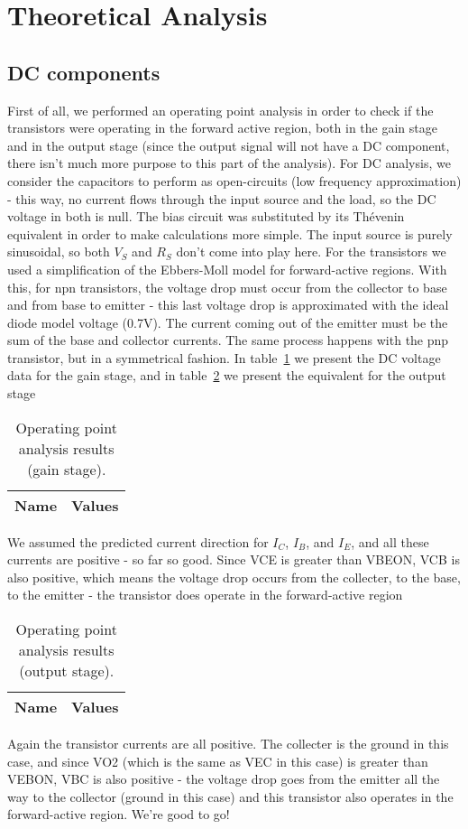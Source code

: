 \section{Theoretical Analysis}
\label{sec:analysis}
\subsection{DC components}
First of all, we performed an operating point analysis in order to check if the transistors were operating in the forward active region, both in the gain stage and in the output stage (since the output signal will not have a DC component, there isn't much more purpose to this part of the analysis). For DC analysis, we consider the capacitors to perform as open-circuits (low frequency approximation) - this way, no current flows through the input source and the load, so the DC voltage in both is null. The bias circuit was substituted by its Thévenin equivalent in order to make calculations more simple. The input source is purely sinusoidal, so both $V_{S}$ and $R_{S}$ don't come into play here. For the transistors we used a simplification of the Ebbers-Moll model for forward-active regions. With this, for npn transistors, the voltage drop must occur from the collector to base and from base to emitter - this last voltage drop is approximated with the ideal diode model voltage (0.7V). The current coming out of the emitter must be the sum of the base and collector currents. The same process happens with the pnp transistor, but in a symmetrical fashion. 
In table~\ref{tab:data} we present the DC voltage data for the gain stage, and in table~\ref{tab:data2} we present the equivalent for the output stage
\begin{table}[h!]
  \centering
  \begin{tabular}{|l|r|}
    \hline    
    {\bf Name} & {\bf Values} \\ \hline
     
  \end{tabular}
  \caption{Operating point analysis results (gain stage).}
  \label{tab:data}
\end{table}
We assumed the predicted current direction for $I_C$, $I_B$, and $I_E$, and all these currents are positive - so far so good. Since VCE is greater than VBEON, VCB is also positive, which means the voltage drop occurs from the collecter, to the base, to the emitter - the transistor does operate in the forward-active region

\begin{table}[h!]
  \centering
  \begin{tabular}{|l|r|}
    \hline    
    {\bf Name} & {\bf Values} \\ \hline
     
  \end{tabular}
  \caption{Operating point analysis results (output stage).}
  \label{tab:data2}
\end{table}
Again the transistor currents are all positive. The collecter is the ground in this case, and since VO2 (which is the same as VEC in this case) is greater than VEBON, VBC is also positive - the voltage drop goes from the emitter all the way to the collector (ground in this case) and this transistor also operates in the forward-active region. We're good to go!

